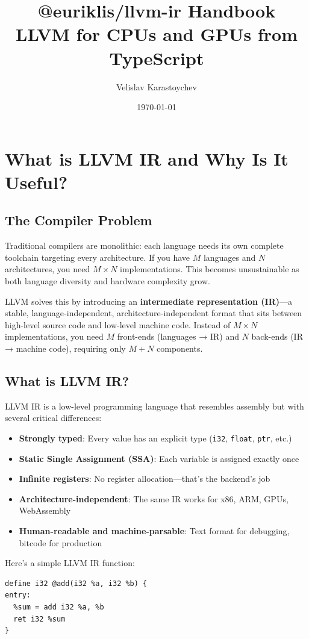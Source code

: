 \documentclass[11pt]{article}
\title{\textbf{@euriklis/llvm-ir Handbook}\\LLVM for CPUs and GPUs from TypeScript}
\author{Velislav Karastoychev}
\date{\today}
\begin{document}
\maketitle
\tableofcontents
\newpage
\section{What is LLVM IR and Why Is It Useful?}

\subsection{The Compiler Problem}
Traditional compilers are monolithic: each language needs its own complete toolchain targeting every architecture. If you have \(M\) languages and \(N\) architectures, you need \(M \times N\) implementations. This becomes unsustainable as both language diversity and hardware complexity grow.

LLVM solves this by introducing an \textbf{intermediate representation (IR)}—a stable, language-independent, architecture-independent format that sits between high-level source code and low-level machine code. Instead of \(M \times N\) implementations, you need \(M\) front-ends (languages → IR) and \(N\) back-ends (IR → machine code), requiring only \(M + N\) components.

\subsection{What is LLVM IR?}
LLVM IR is a low-level programming language that resembles assembly but with several critical differences:

\begin{itemize}[noitemsep]
  \item \textbf{Strongly typed}: Every value has an explicit type (\texttt{i32}, \texttt{float}, \texttt{ptr}, etc.)
  \item \textbf{Static Single Assignment (SSA)}: Each variable is assigned exactly once
  \item \textbf{Infinite registers}: No register allocation—that's the backend's job
  \item \textbf{Architecture-independent}: The same IR works for x86, ARM, GPUs, WebAssembly
  \item \textbf{Human-readable and machine-parsable}: Text format for debugging, bitcode for production
\end{itemize}

Here's a simple LLVM IR function:
\begin{lstlisting}[style=ir]
define i32 @add(i32 %a, i32 %b) {
entry:
  %sum = add i32 %a, %b
  ret i32 %sum
}
\end{lstlisting}
\end{document}
